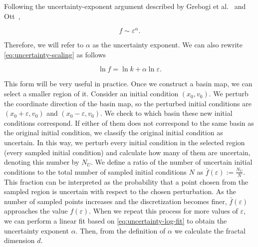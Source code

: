 Following the uncertainty-exponent argument described by Grebogi et al.~\cite{Grebogi1983} and Ott~\cite[p.~206]{Ott2002},

\begin{equation}
  f \sim \varepsilon^{\alpha}.
  \label{eq:uncertainty-scaling}
\end{equation}

Therefore, we will refer to $\alpha$ as the uncertainty exponent. We can also rewrite \eqref{eq:uncertainty-scaling} as follows

\begin{equation}
    \ln{f} = \ln{k} + \alpha\ln{\varepsilon}.
    \label{eq:uncertainty-log-fit}
\end{equation}

This form will be very useful in practice. Once we construct a basin map, we
can select a smaller region of it. Consider an initial condition
\((x_0,v_0)\). We perturb the coordinate direction of the basin map, so the perturbed initial
conditions are \((x_0+\varepsilon,v_0)\) and
\((x_0-\varepsilon,v_0)\). We check to which basin these new initial conditions correspond. If either of
them does not correspond to the same basin as the original initial condition, we
classify the original initial condition as uncertain. In this way, we perturb
every initial condition in the selected region (every sampled initial condition) and calculate how many of them are
uncertain, denoting this number by \(N_U\). We define a ratio of the number of
uncertain initial conditions to the total number of sampled initial conditions
\(N\) as \(\bar{f}(\varepsilon):=\frac{N_U}{N}\). This fraction can be interpreted as
the probability that a point chosen from the sampled region is uncertain with
respect to the chosen perturbation. As the number of sampled points
increases and the discretization becomes finer, \(\bar{f}(\varepsilon)\)
approaches the value \(f(\varepsilon)\). When
we repeat this process for more values of \(\varepsilon\), we can perform a
linear fit based on \eqref{eq:uncertainty-log-fit} to obtain the uncertainty
exponent \(\alpha\). Then, from the definition of $\alpha$ we calculate the fractal dimension $d$.
